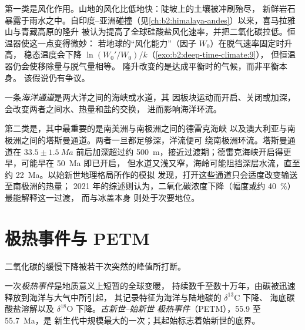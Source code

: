 第一类是风化作用。山地的风化比低地快：陡坡上的土壤被冲刷殆尽，
新鲜岩石暴露于雨水之中。自印度–亚洲碰撞（见\cref{ch:b2:himalaya-andes}）以来，喜马拉雅山与青藏高原的隆升
被认为提高了全球硅酸盐风化速率，并把二氧化碳拉低。恒温器使这一点变得微妙：
若地球的“风化能力”（因子 $W_0$）在脱气速率固定时升高，
稳态温度会下降 $\ln(W_0'/W_0)/k$（\cref{exo:b2:deep-time-climate:9}），
但恒温器仍会使移除量与脱气量相等。
隆升改变的是达成平衡时的气候，而非平衡本身。
该假说仍有争议。

\begin{definition}[海洋通道]\label{def:b2:deep-time-climate:gateway}
一条\emph{海洋通道}是两大洋之间的海峡或水道，其
因板块运动而开启、关闭或加深，会改变两者之间水、热量和盐的交换，
进而影响海洋环流。
\end{definition}

第二类是，其中最重要的是南美洲与南极洲之间的德雷克海峡
以及澳大利亚与南极洲之间的塔斯曼通道。两者一旦都足够深，洋流便可
绕南极洲环流。塔斯曼通道在 $33.5 \pm
\qty{1.5}{Ma}$ 前后加深超过约 \qty{500}{m}，接近过渡期；德雷克海峡开启得更早，可能早在 \qty{50}{Ma} 即已开启，
但水道又浅又窄，海岭可能阻挡深层水流，直至约 \qty{22}{Ma}。以始新世地理格局所作的模拟
发现，打开这些通道只会适度改变输送至南极洲的热量；
2021 年的综述则认为，二氧化碳浓度下降（幅度或约 \qty{40}{\percent}）最能解释这一过渡，
而与冰盖本身
则处于次要地位。

\section{极热事件与 PETM}\label{sec:b2:deep-time-climate:petm}

二氧化碳的缓慢下降被若干次突然的峰值所打断。

\begin{definition}\label{def:b2:deep-time-climate:petm}
一次\emph{极热事件}是地质意义上短暂的全球变暖，
持续数千至数十万年，由碳被迅速释放到海洋与大气中所引起，
其记录特征为海洋与陆地碳的 $\delta^{13}$C 下降、
海底碳酸盐溶解以及 $\delta^{18}$O 下降。\emph{古新世–始新世
极热事件}（PETM），55.9 至 \qty{55.7}{Ma}，是
新生代中规模最大的一次；其起始标志着始新世的底界。
\end{definition}

